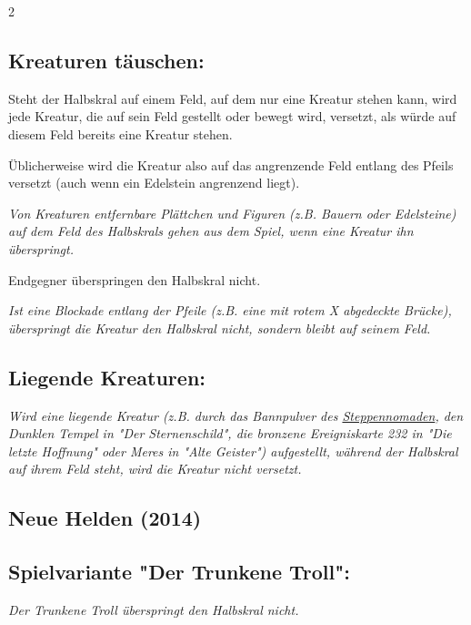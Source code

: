 \documentclass[10pt, a4paper, oneside]{book}
\newcommand{\fan}[1]{\textit{#1}}
\begin{document}
\begin{multicols*}{2}
\begin{nobgcolor}
\subsection{Kreaturen täuschen:}


Steht der Halbskral auf einem Feld, auf dem nur eine Kreatur stehen kann, wird jede Kreatur, die auf sein Feld gestellt\supercite{DH:Begleitheft} oder bewegt wird, versetzt, als würde auf diesem Feld bereits eine Kreatur stehen.

Üblicherweise wird die Kreatur also auf das angrenzende Feld entlang des Pfeils versetzt (auch wenn ein Edelstein angrenzend liegt). 
\supercite{130318}

\fan{Von Kreaturen entfernbare Plättchen und Figuren (z.B. Bauern oder Edelsteine) auf dem Feld des Halbskrals gehen aus dem Spiel, wenn eine Kreatur ihn überspringt.}

Endgegner überspringen den Halbskral nicht.\supercite{DZ:Begleitheft}

\fan{Ist eine Blockade entlang der Pfeile (z.B. eine mit rotem X abgedeckte Brücke), überspringt die Kreatur den Halbskral nicht, sondern bleibt auf seinem Feld.}



\subsection{Liegende Kreaturen:}

\fan{Wird eine liegende Kreatur (z.B. durch das Bannpulver des \hyperref[Steppennomade]{Steppennomaden}, den Dunklen Tempel in "Der Sternenschild", die bronzene Ereigniskarte 232 in "Die letzte Hoffnung" oder Meres in "Alte Geister") aufgestellt, während der Halbskral auf ihrem Feld steht, wird die Kreatur nicht versetzt.}


\end{nobgcolor}





\begin{nobgcolor}
\section{Neue Helden (2014)}

\subsection{Spielvariante "Der Trunkene Troll":}

\fan{Der Trunkene Troll überspringt den Halbskral nicht.}


\end{nobgcolor}
\end{multicols*}
\end{document}
